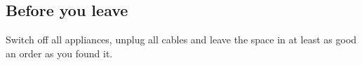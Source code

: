 \documentclass[../Elmag-labhefte-2020.tex]{subfiles}
\begin{document}
\subsection{Before you leave}

Switch off all appliances, unplug all cables and leave the space in at least as good an order as you found it.
\end{document}
